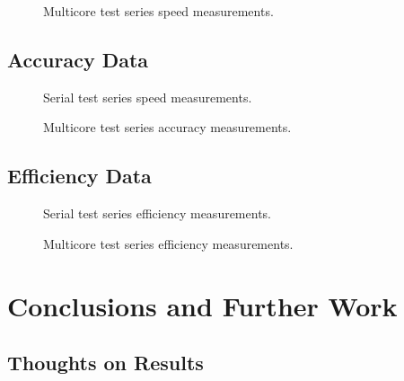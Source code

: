 \documentclass[preprint,12pt]{elsarticle}
\begin{document}
\begin{figure}[h]
  \centering
  \scalebox{.7}{}
  \caption{Multicore test series speed measurements.}
  \label{fig:multi_speed}
\end{figure}

\subsection{Accuracy Data}

\begin{figure}[h]
  \centering
  \scalebox{.7}{}
  \caption{Serial test series speed measurements.}
  \label{fig:serial_accuracy}
\end{figure}

\begin{figure}[h]
  \centering
  \scalebox{.7}{}
  \caption{Multicore test series accuracy measurements.}
  \label{fig:multi_accuracy}
\end{figure}

\subsection{Efficiency Data}

\begin{figure}[h]
  \centering
  \scalebox{.7}{}
  \caption{Serial test series efficiency measurements.}
  \label{fig:serial_efficiency}
\end{figure}

\begin{figure}[h]
  \centering
  \scalebox{.7}{}
  \caption{Multicore test series efficiency measurements.}
  \label{fig:multi_efficiency}
\end{figure}




\section{Conclusions and Further Work}

\subsection{Thoughts on Results}
\end{document}
